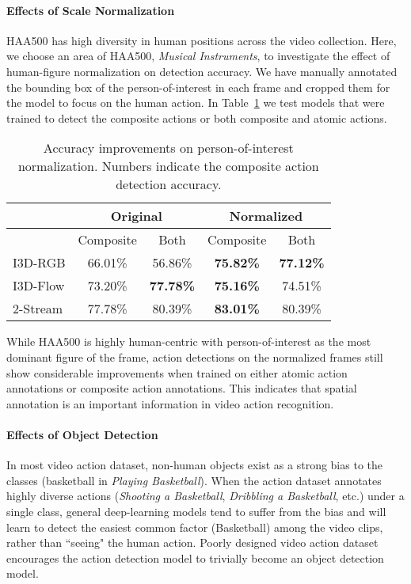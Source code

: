 \documentclass[10pt,twocolumn,letterpaper]{article}
\begin{document}
\paragraph{Effects of Scale Normalization} 

HAA500 has high diversity in human positions across the video collection. Here, we choose an area of HAA500, \textit{Musical Instruments}, to investigate the effect of human-figure normalization on detection accuracy. We have manually annotated the bounding box of the person-of-interest in each frame and cropped them for the model to focus on the human action. In Table~\ref{table:normalize} we test models that were trained to detect the composite actions or both composite and atomic actions. 

\begin{table}[h]
    {\small 
    \begin{center}
        \begin{tabular}{| l |c |c | c | c | }
        \hline
          & \multicolumn{2}{|c|}{Original} & \multicolumn{2}{|c|}{Normalized} \\
          \hline
          & Composite  & Both & Composite  & Both  \\
        \hline
        I3D-RGB  & 66.01\%  & 56.86\%          & \textbf{75.82\%} & \textbf{77.12\%} \\ 
        I3D-Flow & 73.20\%  & \textbf{77.78\%} & \textbf{75.16\%} & 74.51\% \\ 
        2-Stream & 77.78\%  & 80.39\%          & \textbf{83.01\%} & 80.39\% \\ 
        \hline
\end{tabular}
    \end{center}}
    \caption{Accuracy improvements on person-of-interest normalization. Numbers indicate the composite action detection accuracy.}
    \label{table:normalize}
\end{table}

While HAA500 is highly human-centric with person-of-interest as the most dominant figure of the frame, action detections on the normalized frames still show considerable improvements when trained on either atomic action annotations or composite action annotations. This indicates that spatial annotation is an important information in video action recognition.

\paragraph{Effects of Object Detection} 
In most video action dataset, non-human objects exist as a strong bias to the classes (\eg basketball in \textit{Playing Basketball}). 
When the action dataset annotates highly diverse actions (\eg \textit{Shooting a Basketball}, \textit{Dribbling a Basketball}, etc.) under a single class, general deep-learning models tend to suffer from the bias and will learn to detect the easiest common factor (Basketball) among the video clips, rather than ``seeing" the human action. Poorly designed video action dataset encourages the action detection model to trivially become an object detection model. 
\end{document}

